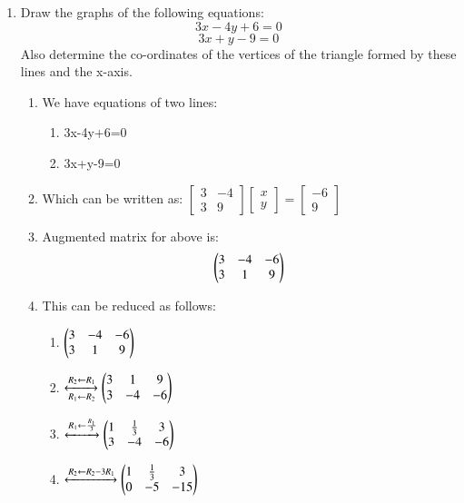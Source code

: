 \documentclass[journal,12pt,twocolumn]{IEEEtran}
\renewcommand\thesection{\arabic{section}}
\begin{document}
\begin{enumerate}[label=\thesection.\arabic*.,ref=\thesection.\theenumi]
\item Draw the graphs of the following equations: 
\[ 3x-4y+6=0 \]
\[ 3x+y-9=0 \]
Also determine the co-ordinates of the vertices of the triangle formed by these lines and the x-axis.\\
\solution\begin{enumerate}
    \item We have equations of two lines:
\begin{enumerate}
    \item 3x-4y+6=0\\
    \item 3x+y-9=0 
\end{enumerate}
\item Which can be written as:
$
\begin{bmatrix}
  3 & -4 \\ 3 & 9
\end{bmatrix}
\begin{bmatrix}
  x \\ y
\end{bmatrix}
=
\begin{bmatrix}
  -6 \\ 9
\end{bmatrix}
$
\item Augmented matrix for above is:
\begin{align}
    \begin{pmatrix}3 & -4 & -6\\
           3 & 1 & 9\end{pmatrix}
\end{align}
\item This can be reduced as follows:
\begin{enumerate}
    \item $\begin{pmatrix}3 & -4 & -6\\
           3 & 1 & 9\end{pmatrix}$
    \item $\xleftrightarrow[R_1 \leftarrow R_2]
    {R_2 \leftarrow R_1}
    \begin{pmatrix}3 & 1 & 9\\
          3 & -4 & -6\end{pmatrix}\\$
          \item $\xleftrightarrow{R_1 \leftarrow \frac{R_1}{3}}
    \begin{pmatrix}1 &\frac{1}{3}&3\\
        3&-4&-6\end{pmatrix}\\$
        \item $\xleftrightarrow{R_2\leftarrow R_2-3R_1}
    \begin{pmatrix}1&\frac{1}{3}&3\\0&-5&-15\end{pmatrix}\\$

\end{enumerate}
\end{enumerate}
\end{enumerate}
\end{document}
